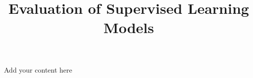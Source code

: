 \title{Evaluation of Supervised Learning Models}
\label{chp:evaluation-supervised-learning}
\author{}
\institute{}
\maketitle

Add your content here




